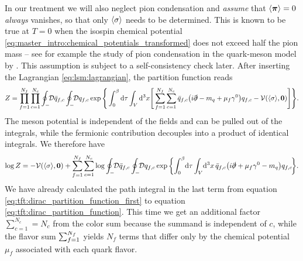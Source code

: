 In our treatment we will also neglect pion condensation and \emph{assume} that $\langle {\bm{\pi}} \rangle=0$ \emph{always} vanishes,
so that only $\langle \sigma \rangle$ needs to be determined.
This is known to be true at $T=0$ when the isospin chemical potential \eqref{eq:master_intro:chemical_potentials_transformed} does not exceed half the pion mass
-- see for example the study of pion condensation in the quark-meson model by \cite{ref:jo_lsm_consistent,ref:jo_lsm_pion_condensation}.
This assumption is subject to a self-consistency check later.
After inserting the Lagrangian \eqref{eq:lsm:lagrangian}, the partition function reads
\pagebreak
\begin{equation}
	Z = \prod_{f=1}^{\smash{N_f}} \prod_{c=1}^{\smash{N_c}} \oint_- \!\! \mathcal{D} \bar{q}_{f,c} \oint_- \!\! \mathcal{D} q_{f,c} \exp \Bigg\{ \int_0^{\beta} \mathop{}\!\mathrm{d} \tau \int_V \mathop{}\!\mathrm{d}^3 x \Bigg[ \sum_{f=1}^{\smash{N_f}} \sum_{c=1}^{N_c} \bar{q}_{f,c} \big( i \slashed\partial - m_q + \mu_f \gamma^0 \big) q_{f,c} - \mathcal{V}(\langle \sigma \rangle,{\bm{0}}) \Bigg] \Bigg\}.
\end{equation}
The meson potential is independent of the fields and can be pulled out of the integrals,
while the fermionic contribution decouples into a product of identical integrals.
We therefore have
\begin{equation}
\begin{split}
	\log Z = -\pot(\avg{\sigma},\vec{0}) + \sum_{f=1}^{\smash{N_f}} \sum_{c=1}^{N_c} \log \oint_- \!\! \pathintdif \bar{q}_{f,c} \oint_- \!\! \pathintdif q_{f,c} \exp \bigg\{ \! \int_0^\beta \! \dif \tau \int_V \! \dif^3 x \, \bar{q}_{f,c} \big(i \slashed\partial + \mu_f \gamma^0 - m_q\big) q_{f,c} \! \bigg\} .
\end{split}
\end{equation}
We have already calculated the path integral in the last term
from equation \eqref{eq:tft:dirac_partition_function_first} to equation \eqref{eq:tft:dirac_partition_function}.
This time we get an additional factor $\sum_{c=1}^{N_c} = N_c$ from the color sum because the summand is independent of $c$,
while the flavor sum $\sum_{f=1}^{\smash{N_f}}$ yields $N_f$ terms that differ only by the chemical potential $\mu_f$ associated with each quark flavor. 
